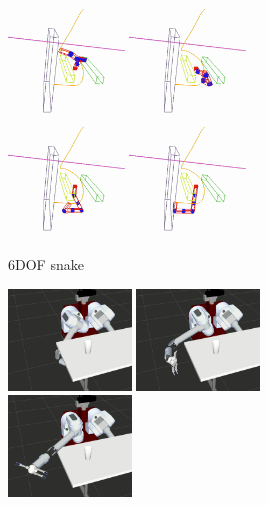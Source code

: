 \documentclass[letterpaper, 10 pt, conference]{ieeeconf}  %
\begin{document}
\begin{figure}[t!]
\begin{subfigure}[b]{\textwidth}
		\includegraphics[height=3cm]{fig/planning_efficiency/6dof_2}
		\includegraphics[height=3cm]{fig/planning_efficiency/6dof_3}
		\includegraphics[height=3cm]{fig/planning_efficiency/6dof_4}
		\includegraphics[height=3cm]{fig/planning_efficiency/6dof_5}
		\caption{6DOF snake}
		\label{fig:planning_efficiency:6dof:example}
	\end{subfigure}
	\begin{subfigure}[b]{\textwidth}
    \centering
    \includegraphics[height=2.7cm]{fig/planning_efficiency/herb_batting_1}
    \includegraphics[height=2.7cm]{fig/planning_efficiency/herb_batting_2}
    \includegraphics[height=2.7cm]{fig/planning_efficiency/herb_batting_3}

\end{subfigure}
\end{figure}
\end{document}
